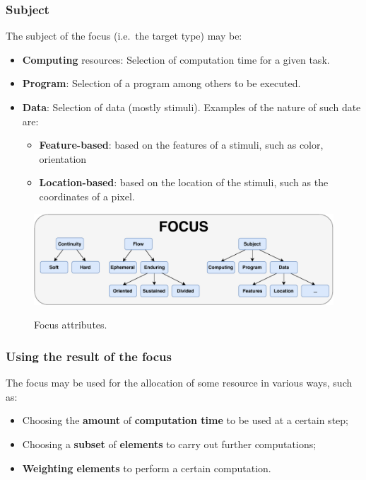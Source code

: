 \documentclass[11pt]{article}
\begin{document}
\subsubsection{Subject}
The subject of the focus (i.e.\ the target type) may be:
\begin{itemize}
    \item \textbf{Computing} resources: Selection of computation time for a given task.
    \item \textbf{Program}: Selection of a program among others to be executed.
    \item \textbf{Data}: Selection of data (mostly stimuli). Examples of the nature of such date are:
    \begin{itemize}
        \item \textbf{Feature-based}: based on the features of a stimuli, such as color, orientation\ellipsis\
        \item \textbf{Location-based}: based on the location of the stimuli, such as the coordinates of a pixel.
    \end{itemize}
\end{itemize}

\begin{figure}[H]
    \centering
    \includegraphics[width=1.0\linewidth]{./img/taxonomy.pdf}\label{fig:taxonomy}
    \caption{Focus attributes.}
\end{figure}

\subsubsection{Using the result of the focus}
The focus may be used for the allocation of some resource in various ways, such as:
\begin{itemize}
    \item Choosing the \textbf{amount} of \textbf{computation time} to be used at a certain step;
    \item Choosing a \textbf{subset} of \textbf{elements} to carry out further computations;
    \item \textbf{Weighting elements} to perform a certain computation.
\end{itemize}
\end{document}
